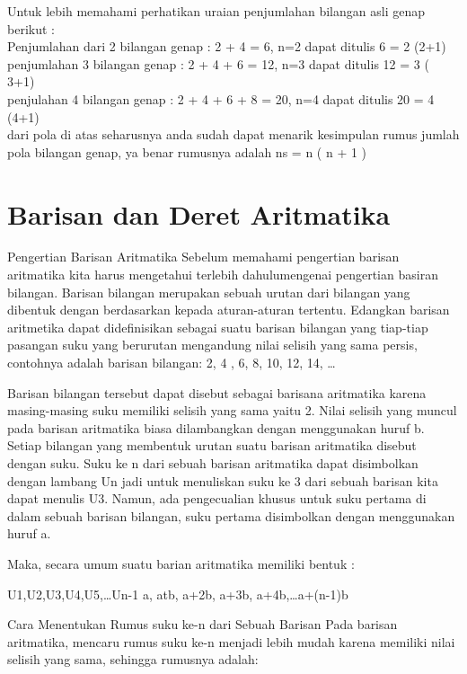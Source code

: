 \documentclass[11pt,fleqn]{book} %
\begin{document}
\noindent Untuk lebih memahami perhatikan uraian penjumlahan bilangan asli genap berikut :\\
Penjumlahan dari 2 bilangan genap :
2 + 4 = 6, n=2 dapat ditulis 6 = 2 (2+1)\\
penjumlahan 3 bilangan genap :
2 + 4 + 6 = 12, n=3 dapat ditulis 12 = 3 ( 3+1)\\
penjulahan 4 bilangan genap :
2 + 4 + 6 + 8 = 20, n=4 dapat ditulis 20 = 4 (4+1)\\

dari pola di atas seharusnya anda sudah dapat menarik kesimpulan rumus jumlah pola bilangan genap, ya benar rumusnya adalah ns = n ( n + 1 )\\


\section{Barisan dan Deret Aritmatika}
Pengertian Barisan Aritmatika
Sebelum memahami pengertian barisan aritmatika kita harus mengetahui terlebih dahulumengenai pengertian basiran bilangan. Barisan bilangan merupakan sebuah urutan dari bilangan yang dibentuk dengan berdasarkan kepada aturan-aturan tertentu. Edangkan barisan aritmetika dapat didefinisikan sebagai suatu barisan bilangan yang tiap-tiap pasangan suku yang berurutan mengandung nilai selisih yang sama persis, contohnya adalah barisan bilangan: 2, 4 , 6, 8, 10, 12, 14, …

Barisan bilangan tersebut dapat disebut sebagai barisana aritmatika karena masing-masing suku memiliki selisih yang sama yaitu 2. Nilai selisih yang muncul pada barisan aritmatika biasa dilambangkan dengan menggunakan huruf b. Setiap bilangan yang membentuk urutan suatu barisan aritmatika disebut dengan suku. Suku ke n dari sebuah barisan aritmatika dapat disimbolkan dengan lambang Un jadi untuk menuliskan suku ke 3 dari sebuah barisan kita dapat menulis U3. Namun, ada pengecualian khusus untuk suku pertama di dalam sebuah barisan bilangan, suku pertama disimbolkan dengan menggunakan huruf a.

Maka, secara umum suatu barian aritmatika memiliki bentuk :

U1,U2,U3,U4,U5,…Un-1
a, atb, a+2b, a+3b, a+4b,…a+(n-1)b

Cara Menentukan Rumus suku ke-n dari Sebuah Barisan
Pada barisan aritmatika, mencaru rumus suku ke-n menjadi lebih mudah karena memiliki nilai selisih yang sama, sehingga rumusnya adalah:
\end{document}
